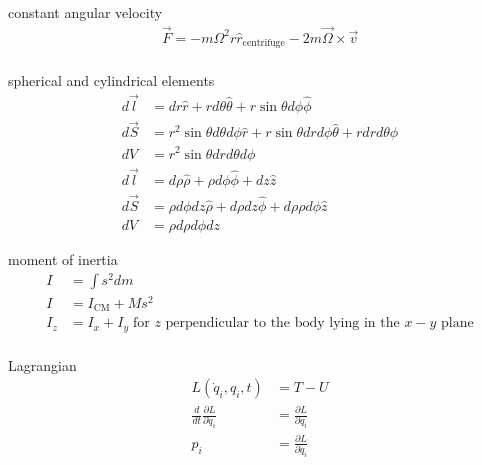 \documentclass[avery5388, frame]{flashcards}
\begin{document}
\begin{flashcard}{constant angular velocity}
  {
    \begin{align*}
      \vec{F} = - m \Omega^{2} r \hat{r}_{\textrm{centrifuge}} - 2 m \vec{\Omega} \times \vec{v}\\
    \end{align*}
  }
\end{flashcard}

\begin{flashcard}{spherical and cylindrical elements}
  {
    \begin{align*}
      d\vec{l} &= dr \hat{r} + r d\theta \hat{\theta} + r \sin\theta d\phi \hat{\phi}\\
      d\vec{S} &= r^{2}\sin\theta d\theta d\phi \hat{r} + r \sin\theta dr d\phi \hat{\theta} + r dr d\theta \hat{\phi}\\
      dV &= r^{2}\sin\theta dr d\theta d\phi\\
      d\vec{l} &= d\rho \hat{\rho} + \rho d\phi \hat{\phi} + dz \hat{z}\\
      d\vec{S} &= \rho d\phi dz \hat{\rho} + d\rho dz \hat{\phi} + d\rho \rho d\phi \hat{z}\\
      dV &= \rho d\rho d\phi dz
    \end{align*}
  }
\end{flashcard}

\begin{flashcard}{moment of inertia}
  {
    \begin{align*}
      I &= \int{s^{2} dm}\\
      I &= I_{\textrm{CM}} + M s^{2}\\
      I_{z} &= I_{x} + I_{y} \; \textrm{for $z$ perpendicular to the body lying in the $x-y$ plane}\\
    \end{align*}
  }
\end{flashcard}

\begin{flashcard}{Lagrangian}
  {
    \begin{align*}
        L(\dot{q}_{i}, q_{i}, t) &= T - U\\
        \frac{d}{dt} \frac{\partial L}{\partial \dot{q}_{i}} &= \frac{\partial L}{\partial q_{i}}\\
        p_{i} &= \frac{\partial L}{\partial \dot{q}_{i}}\\
    \end{align*}
  }
\end{flashcard}
\end{document}
